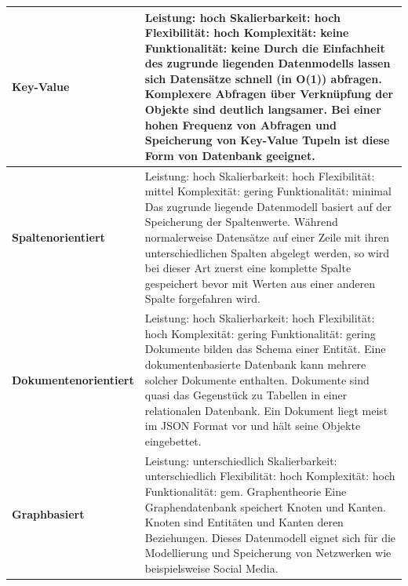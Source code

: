 \begin{longtable}{| p{4cm} | p{11.7cm} |}
\hline
\textbf{Key-Value} & Leistung: hoch \newline Skalierbarkeit: hoch \newline Flexibilität: hoch \newline Komplexität: keine \newline Funktionalität: keine \newline
Durch die Einfachheit des zugrunde liegenden Datenmodells lassen sich Datensätze schnell (in O(1)) abfragen. Komplexere Abfragen über Verknüpfung der Objekte sind deutlich langsamer. Bei einer hohen Frequenz von Abfragen und Speicherung von Key-Value Tupeln ist diese Form von Datenbank geeignet.
\\ \hline
\textbf{Spaltenorientiert} & Leistung: hoch \newline Skalierbarkeit: hoch \newline Flexibilität: mittel \newline Komplexität: gering \newline Funktionalität: minimal \newline
Das zugrunde liegende Datenmodell basiert auf der Speicherung der Spaltenwerte. Während normalerweise Datensätze auf einer Zeile mit ihren unterschiedlichen Spalten abgelegt werden, so wird bei dieser Art zuerst eine komplette Spalte gespeichert bevor mit Werten aus einer anderen Spalte forgefahren wird. 
\\ \hline
\textbf{Dokumentenorientiert} & Leistung: hoch \newline Skalierbarkeit: hoch \newline Flexibilität: hoch \newline Komplexität: gering \newline Funktionalität: gering \newline
Dokumente bilden das Schema einer Entität. Eine dokumentenbasierte Datenbank kann mehrere solcher Dokumente enthalten. Dokumente sind quasi das Gegenstück zu Tabellen in einer relationalen Datenbank. Ein Dokument liegt meist im JSON Format vor und hält seine Objekte eingebettet. 
\\ \hline
\textbf{Graphbasiert} & Leistung: unterschiedlich \newline Skalierbarkeit: unterschiedlich \newline Flexibilität: hoch \newline Komplexität: hoch \newline Funktionalität: gem. Graphentheorie \newline
Eine Graphendatenbank speichert Knoten und Kanten. Knoten sind Entitäten und Kanten deren Beziehungen. Dieses Datenmodell eignet sich für die Modellierung und Speicherung von Netzwerken wie beispielsweise Social Media.
\\ \hline
\end{longtable}

